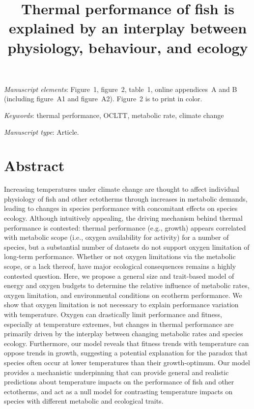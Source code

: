 \documentclass[11pt]{article}\usepackage[]{graphicx}\usepackage[]{color}
\title{Thermal performance of fish is explained by an interplay between physiology, behaviour, and ecology}
\date{}
\begin{document}
\maketitle

% 

\bigskip

\textit{Manuscript elements}: Figure~1, figure~2, table~1, online appendices~A and B (including figure~A1 and figure~A2). Figure~2 is to print in color.

\bigskip

\textit{Keywords}: thermal performance, OCLTT, metabolic rate, climate change

\bigskip

\textit{Manuscript type}: Article.

\bigskip


\linenumbers{}
\modulolinenumbers[3]

\newpage{}

\section*{Abstract}

Increasing temperatures under climate change are thought to affect individual physiology of fish and other ectotherms through increases in metabolic demands, leading to changes in species performance with concomitant effects on species ecology. Although intuitively appealing, the driving mechanism behind thermal performance is contested: thermal performance (e.g., growth) appears correlated with metabolic scope (i.e., oxygen availability for activity) for a number of species, but a substantial number of datasets do not support oxygen limitation of long-term performance. Whether or not oxygen limitations via the metabolic scope, or a lack thereof, have major ecological consequences remains a highly contested question. Here, we propose a general size and trait-based model of energy and oxygen budgets to determine the relative influence of metabolic rates, oxygen limitation, and environmental conditions on ecotherm performance. We show that oxygen limitation is not necessary to explain performance variation with temperature. Oxygen can drastically limit performance and fitness, especially at temperature extremes, but changes in thermal performance are primarily driven by the interplay between changing metabolic rates and species ecology. Furthermore, our model reveals that fitness trends with temperature can oppose trends in growth, suggesting a potential explanation for the paradox that species often occur at lower temperatures than their growth-optimum. Our model provides a mechanistic underpinning that can provide general and realistic predictions about temperature impacts on the performance of fish and other ectotherms, and act as a null model for contrasting temperature impacts on species with different metabolic and ecological traits.
\end{document}
